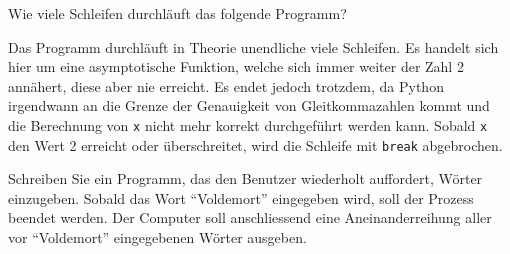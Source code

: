 \begin{mychallenge}
	Wie viele Schleifen durchläuft das folgende Programm?
	
	\begin{myanswer}
		Das Programm durchläuft in Theorie unendliche viele Schleifen. Es handelt sich hier um eine asymptotische Funktion, welche sich immer weiter der Zahl 2 annähert, diese aber nie erreicht. Es endet jedoch trotzdem, da Python irgendwann an die Grenze der Genauigkeit von Gleitkommazahlen kommt und die Berechnung von \lstinline|x| nicht mehr korrekt durchgeführt werden kann. Sobald \lstinline|x| den Wert 2 erreicht oder überschreitet, wird die Schleife mit \lstinline|break| abgebrochen.
	\end{myanswer}
\end{mychallenge}

\begin{myexercise}
	Schreiben Sie ein Programm, das den Benutzer wiederholt auffordert, Wörter einzugeben. Sobald das Wort \enquote{Voldemort} eingegeben wird, soll der Prozess beendet werden. Der Computer soll anschliessend eine Aneinanderreihung aller vor \enquote{Voldemort} eingegebenen Wörter ausgeben.
	\begin{myanswer}
		
	\end{myanswer}
\end{myexercise}

